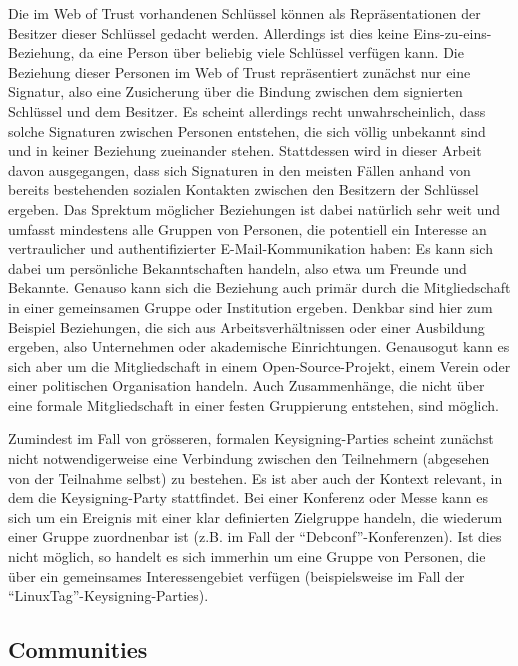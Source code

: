 Die im Web of Trust vorhandenen Schl\"ussel k\"onnen als
Repr\"asentationen der Besitzer dieser Schl\"ussel gedacht
werden. Allerdings ist dies keine Eins-zu-eins-Beziehung, da eine
Person \"uber beliebig viele Schl\"ussel verf\"ugen kann. Die
Beziehung dieser Personen im Web of Trust repr\"asentiert zun\"achst
nur eine Signatur, also eine Zusicherung \"uber die Bindung zwischen
dem signierten Schl\"ussel und dem Besitzer. Es scheint allerdings
recht unwahrscheinlich, dass solche Signaturen zwischen Personen
entstehen, die sich v\"ollig unbekannt sind und in keiner Beziehung
zueinander stehen. Stattdessen wird in dieser Arbeit davon
ausgegangen, dass sich Signaturen in den meisten F\"allen anhand von
bereits bestehenden sozialen Kontakten zwischen den Besitzern der
Schl\"ussel ergeben\cite{Capkun2002}. Das Sprektum m\"oglicher Beziehungen ist dabei
nat\"urlich sehr weit und umfasst mindestens alle Gruppen von
Personen, die potentiell ein Interesse an vertraulicher und
authentifizierter E-Mail-Kommunikation haben: Es kann sich dabei um
pers\"onliche Bekanntschaften handeln, also etwa um Freunde und
Bekannte. Genauso kann sich die Beziehung auch prim\"ar durch die
Mitgliedschaft in einer gemeinsamen Gruppe oder Institution
ergeben. Denkbar sind hier zum Beispiel Beziehungen, die sich aus
Arbeitsverh\"altnissen oder einer Ausbildung ergeben, also Unternehmen
oder akademische Einrichtungen. Genausogut kann es sich aber um die
Mitgliedschaft in einem Open-Source-Projekt, einem Verein oder einer
politischen Organisation handeln. Auch Zusammenh\"ange, die nicht
\"uber eine formale Mitgliedschaft in einer festen Gruppierung
entstehen, sind m\"oglich.

Zumindest im Fall von gr\"osseren, formalen Keysigning-Parties scheint
zun\"achst nicht notwendigerweise eine Verbindung zwischen den
Teilnehmern (abgesehen von der Teilnahme selbst) zu bestehen. Es ist
aber auch der Kontext relevant, in dem die Keysigning-Party
stattfindet. Bei einer Konferenz oder Messe kann es sich um ein
Ereignis mit einer klar definierten Zielgruppe handeln, die wiederum
einer Gruppe zuordnenbar ist (z.B. im Fall der
``Debconf''-Konferenzen). Ist dies nicht m\"oglich, so handelt es sich
immerhin um eine Gruppe von Personen, die \"uber ein gemeinsames
Interessengebiet verf\"ugen (beispielsweise im Fall der
``LinuxTag''-Keysigning-Parties).

\subsection{Communities}
\label{ch:Grundlagen:sec:Netzwerkanalyse:subsec:Communities}

